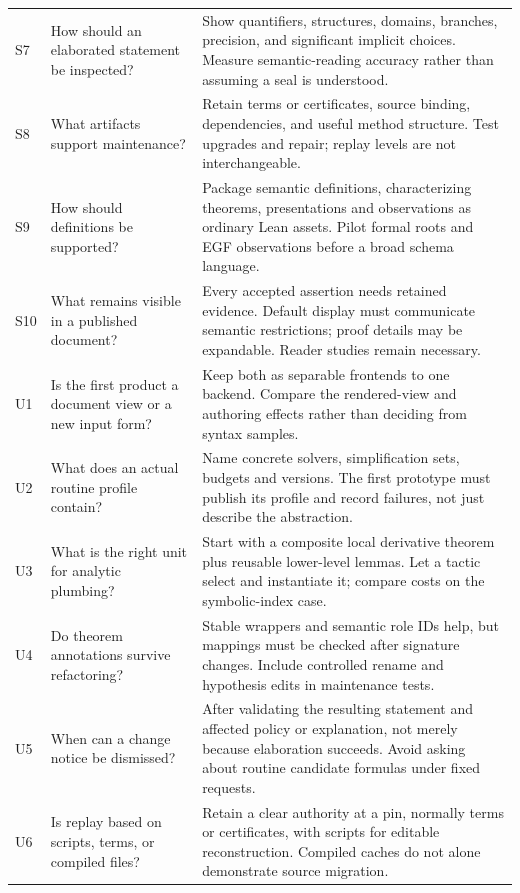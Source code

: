 \documentclass[11pt,letterpaper]{article}
\begin{document}
{\begin{longtable}{@{}P{.35in}P{2.05in}P{3.65in}@{}}
S7 & How should an elaborated statement be inspected? & Show quantifiers,
structures, domains, branches, precision, and significant implicit choices.
Measure semantic-reading accuracy rather than assuming a seal is understood.\\
S8 & What artifacts support maintenance? & Retain terms or certificates, source
binding, dependencies, and useful method structure. Test upgrades and repair;
replay levels are not interchangeable.\\
S9 & How should definitions be supported? & Package semantic definitions,
characterizing theorems, presentations and observations as ordinary Lean assets.
Pilot formal roots and EGF observations before a broad schema language.\\
S10 & What remains visible in a published document? & Every accepted assertion
needs retained evidence. Default display must communicate semantic restrictions;
proof details may be expandable. Reader studies remain necessary.\\
U1 & Is the first product a document view or a new input form? & Keep both as
separable frontends to one backend. Compare the rendered-view and authoring
effects rather than deciding from syntax samples.\\
U2 & What does an actual routine profile contain? & Name concrete solvers,
simplification sets, budgets and versions. The first prototype must publish its
profile and record failures, not just describe the abstraction.\\
U3 & What is the right unit for analytic plumbing? & Start with a composite local
derivative theorem plus reusable lower-level lemmas. Let a tactic select and
instantiate it; compare costs on the symbolic-index case.\\
U4 & Do theorem annotations survive refactoring? & Stable wrappers and semantic
role IDs help, but mappings must be checked after signature changes. Include
controlled rename and hypothesis edits in maintenance tests.\\
U5 & When can a change notice be dismissed? & After validating the resulting
statement and affected policy or explanation, not merely because elaboration
succeeds. Avoid asking about routine candidate formulas under fixed requests.\\
U6 & Is replay based on scripts, terms, or compiled files? & Retain a clear
authority at a pin, normally terms or certificates, with scripts for editable
reconstruction. Compiled caches do not alone demonstrate source migration.\\

\end{longtable}}
\end{document}
